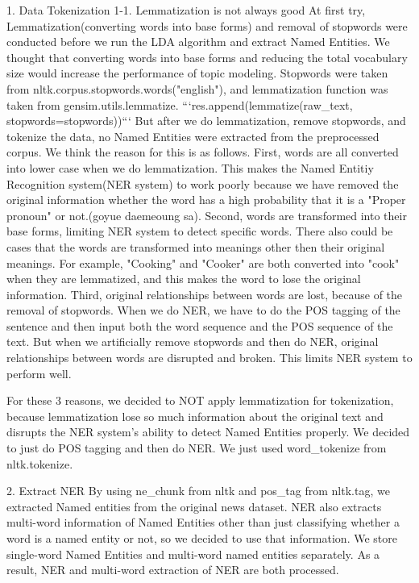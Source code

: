 1. Data Tokenization
1-1. Lemmatization is not always good
At first try, Lemmatization(converting words into base forms) and removal of stopwords were conducted before we run the LDA algorithm and extract Named Entities. We thought that converting words into base forms and reducing the total vocabulary size would increase the performance of topic modeling. Stopwords were taken from nltk.corpus.stopwords.words("english"), and lemmatization function was taken from gensim.utils.lemmatize. ```res.append(lemmatize(raw_text, stopwords=stopwords))``` But after we do lemmatization, remove stopwords, and tokenize the data, no Named Entities were extracted from the preprocessed corpus. We think the reason for this is as follows. 
First, words are all converted into lower case when we do lemmatization. This makes the Named Entitiy Recognition system(NER system) to work poorly because we have removed the original information whether the word has a high probability that it is a "Proper pronoun" or not.(goyue daemeoung sa).
Second, words are transformed into their base forms, limiting NER system to detect specific words. There also could be cases that the words are transformed into meanings other then their original meanings. For example, "Cooking" and "Cooker" are both converted into "cook" when they are lemmatized, and this makes the word to lose the original information.
Third, original relationships between words are lost, because of the removal of stopwords. When we do NER, we have to do the POS tagging of the sentence and then input both the word sequence and the POS sequence of the text. But when we artificially remove stopwords and then do NER, original relationships between words are disrupted and broken. This limits NER system to perform well.

For these 3 reasons, we decided to NOT apply lemmatization for tokenization, because lemmatization lose so much information about the original text and disrupts the NER system's ability to detect Named Entities properly. We decided to just do POS tagging and then do NER. We just used word_tokenize from nltk.tokenize.

2. Extract NER
By using ne_chunk from nltk and pos_tag from nltk.tag, we extracted Named entities from the original news dataset. NER also extracts multi-word information of Named Entities other than just classifying whether a word is a named entity or not, so we decided to use that information. We store single-word Named Entities and multi-word named entities separately. As a result, NER and multi-word extraction of NER are both processed.

